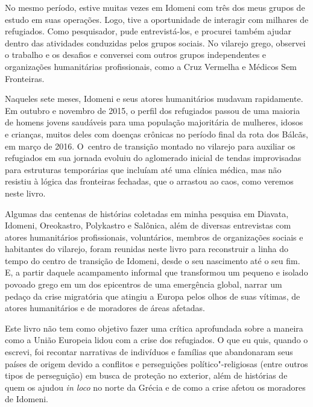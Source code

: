 No mesmo período, estive muitas vezes em Idomeni com três dos meus grupos de estudo em suas operações. Logo, tive a oportunidade de interagir com milhares de refugiados. Como pesquisador, pude entrevistá-los, e  procurei também ajudar dentro das atividades conduzidas pelos grupos sociais. No vilarejo
grego, observei o trabalho e os desafios e conversei com outros
grupos independentes e organizações humanitárias profissionais, como a
Cruz Vermelha e Médicos Sem Fronteiras.

Naqueles sete meses, Idomeni e seus atores humanitários mudavam
rapidamente.  Em outubro e novembro de 2015, o perfil dos refugiados passou de uma maioria
de homens jovens saudáveis para uma população majoritária de mulheres, idosos e crianças, muitos deles com
doenças crônicas no período final da rota dos Bálcãs, em março de 2016.
O~centro de transição montado no vilarejo para auxiliar os refugiados em
sua jornada evoluiu do aglomerado inicial de tendas improvisadas para
estruturas temporárias que incluíam até uma clínica médica, mas não
resistiu à lógica das fronteiras fechadas, que o arrastou ao caos, como veremos neste livro. 
% 
% 
% 
% 
%
%

Algumas das centenas de histórias coletadas em minha pesquisa em
Diavata, Idomeni, Oreokastro, Polykastro e Salônica, além de diversas
entrevistas com atores humanitários profissionais, voluntários, membros
de organizações sociais e habitantes do vilarejo, foram reunidas neste
livro para reconstruir a linha do tempo do centro de transição de
Idomeni, desde o seu nascimento até o seu fim. E, a partir daquele
acampamento informal que transformou um pequeno e isolado povoado grego
em um dos epicentros de uma emergência global, narrar um pedaço da crise
migratória que atingiu a Europa pelos olhos de suas vítimas, de atores
humanitários e de moradores de áreas afetadas.

Este livro não tem como objetivo fazer uma crítica aprofundada sobre a
maneira como a União Europeia lidou com a crise dos refugiados. O que eu quis, quando o escrevi, foi 
recontar narrativas de indivíduos e famílias que abandonaram seus países
de origem devido a conflitos e perseguições político"-religiosas (entre
outros tipos de perseguição) em busca de proteção no exterior, além de
histórias de quem os ajudou \emph{in loco} no norte da Grécia e de como
a crise afetou os moradores de Idomeni.


